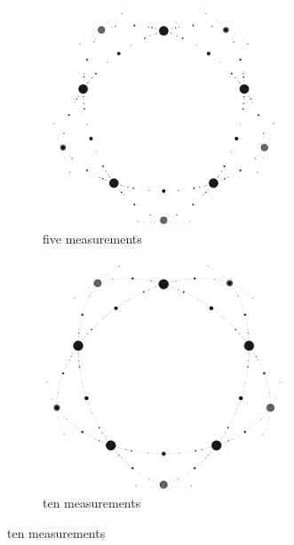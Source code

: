 \begin{figure}
\begin{subfigure}{0.5\textwidth}
            \centering 
            \includegraphics[width=0.8\textwidth]{images/n=5,mnts=5.png}
            \caption{five measurements}
        \end{subfigure}
        \hfill
        \begin{subfigure}{0.5\textwidth}
            \centering 
            \includegraphics[width=0.8\textwidth]{images/n=5,mnts=10.png}
            \caption{ten measurements}
        \end{subfigure}

\end{figure}
